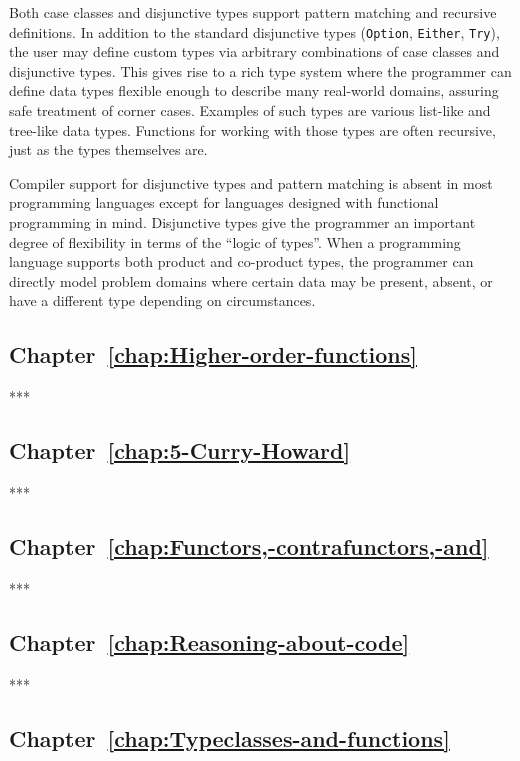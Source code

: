 Both case classes and disjunctive types support pattern matching and
recursive definitions. In addition to the standard disjunctive types
(\lstinline!Option!, \lstinline!Either!, \lstinline!Try!), the
user may define custom types via arbitrary combinations of case classes
and disjunctive types. This gives rise to a rich type system where
the programmer can define data types flexible enough to describe many
real-world domains, assuring safe treatment of corner cases. Examples
of such types are various list-like and tree-like data types. Functions
for working with those types are often recursive, just as the types
themselves are.

Compiler support for disjunctive types and pattern matching is absent
in most programming languages except for languages designed with functional
programming in mind. Disjunctive types give the programmer an important
degree of flexibility in terms of the \textsf{``}logic of types\textsf{''}. When a
programming language supports both product and co-product types, the
programmer can directly model problem domains where certain data may
be present, absent, or have a different type depending on circumstances.

\subsection{Chapter~\ref{chap:Higher-order-functions}}

{*}{*}{*}

\subsection{Chapter~\ref{chap:5-Curry-Howard}}

{*}{*}{*}

\subsection{Chapter~\ref{chap:Functors,-contrafunctors,-and}}

{*}{*}{*}

\subsection{Chapter~\ref{chap:Reasoning-about-code}}

{*}{*}{*}

\subsection{Chapter~\ref{chap:Typeclasses-and-functions}}

